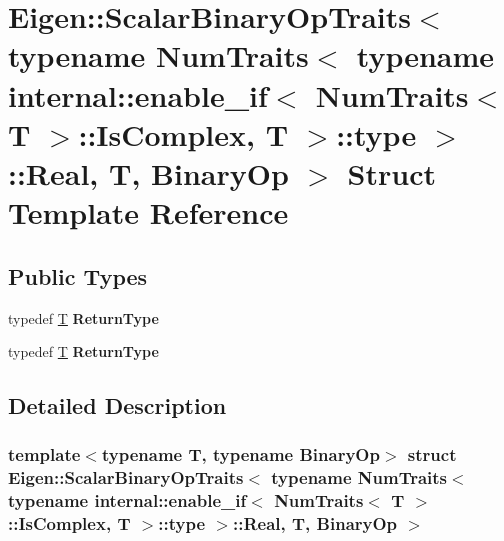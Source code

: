 \hypertarget{struct_eigen_1_1_scalar_binary_op_traits_3_01typename_01_num_traits_3_01typename_01internal_1_1e682c29bad5c4221eece44bbf2be041d0}{}\section{Eigen\+:\+:Scalar\+Binary\+Op\+Traits$<$ typename Num\+Traits$<$ typename internal\+:\+:enable\+\_\+if$<$ Num\+Traits$<$ T $>$\+:\+:Is\+Complex, T $>$\+:\+:type $>$\+:\+:Real, T, Binary\+Op $>$ Struct Template Reference}
\label{struct_eigen_1_1_scalar_binary_op_traits_3_01typename_01_num_traits_3_01typename_01internal_1_1e682c29bad5c4221eece44bbf2be041d0}
\subsection*{Public Types}
\begin{DoxyCompactItemize}
\item 
\mbox{\label{struct_eigen_1_1_scalar_binary_op_traits_3_01typename_01_num_traits_3_01typename_01internal_1_1e682c29bad5c4221eece44bbf2be041d0_a06cb8365d175cb46f94c2c335b902c7a}} 
typedef \hyperlink{group___sparse_core___module}{T} {\bfseries Return\+Type}
\item 
\mbox{\label{struct_eigen_1_1_scalar_binary_op_traits_3_01typename_01_num_traits_3_01typename_01internal_1_1e682c29bad5c4221eece44bbf2be041d0_a06cb8365d175cb46f94c2c335b902c7a}} 
typedef \hyperlink{group___sparse_core___module}{T} {\bfseries Return\+Type}
\end{DoxyCompactItemize}


\subsection{Detailed Description}
\subsubsection*{template$<$typename T, typename Binary\+Op$>$\newline
struct Eigen\+::\+Scalar\+Binary\+Op\+Traits$<$ typename Num\+Traits$<$ typename internal\+::enable\+\_\+if$<$ Num\+Traits$<$ T $>$\+::\+Is\+Complex, T $>$\+::type $>$\+::\+Real, T, Binary\+Op $>$}



